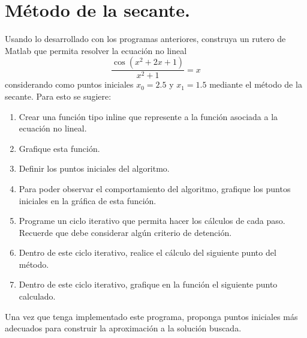 \documentclass[letter,11pt]{article}
\newcommand\0{\mathbf{0}}
\newcommand{\matlab}{{\sc Matlab} }
\begin{document}
\section{M\'etodo de la secante.}
Usando lo desarrollado con los programas anteriores, construya un rutero de \matlab  que permita resolver la ecuaci\'on no lineal
$$
\frac{\cos(x^2+2x+1)}{x^2+1}=x
$$
considerando como puntos iniciales $x_0=2.5$ y $x_1=1.5$ mediante el m\'etodo de la secante. Para esto se sugiere:
\begin{enumerate}
\item Crear una funci\'on tipo inline que represente a la funci\'on asociada a la ecuaci\'on no lineal.
\item Grafique esta funci\'on.
\item Definir los puntos iniciales del algoritmo.
\item Para poder observar el comportamiento del algoritmo, grafique los puntos iniciales en la gr\'afica de esta funci\'on.
\item Programe un ciclo iterativo que permita hacer los c\'alculos de cada paso. Recuerde que debe considerar alg\'un criterio de detenci\'on.
\item Dentro de este ciclo iterativo, realice el c\'alculo del siguiente punto del m\'etodo.
\item Dentro de este ciclo iterativo, grafique en la funci\'on el siguiente punto calculado.
\end{enumerate}

Una vez que tenga implementado este programa, proponga puntos iniciales m\'as adecuados para construir la aproximaci\'on a la soluci\'on buscada.
\end{document}

